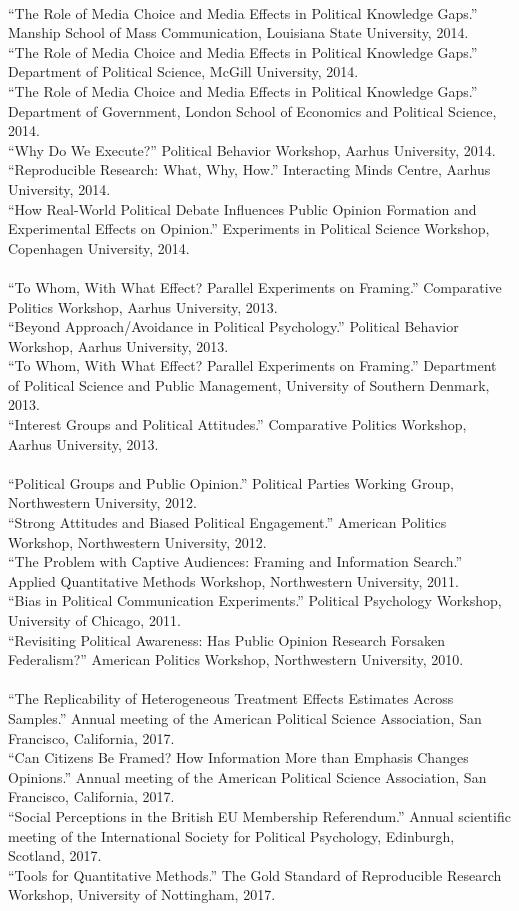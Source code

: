 \documentclass[12pt]{article}
\newcommand{\topic}[1]{\pagebreak[3]\indent {\color{lg}{\footnotesize #1 }}\\}
\newcommand{\entry}[1]{\indent {\color{lg}\guillemotright}\hspace{2pt}#1\vspace{.25em}\\}
\begin{document}
	\topic{Invited Presentations (2014)}
	\entry{``The Role of Media Choice and Media Effects in Political Knowledge Gaps.'' Manship School of Mass Communication, Louisiana State University, 2014.}
	\entry{``The Role of Media Choice and Media Effects in Political Knowledge Gaps.'' Department of Political Science, McGill University, 2014.}
	\entry{``The Role of Media Choice and Media Effects in Political Knowledge Gaps.'' Department of Government, London School of Economics and Political Science, 2014.}
	\entry{``Why Do We Execute?'' Political Behavior Workshop, Aarhus University, 2014.}
	\entry{``Reproducible Research: What, Why, How.'' Interacting Minds Centre, Aarhus University, 2014.}
	\entry{``How Real-World Political Debate Influences Public Opinion Formation and Experimental Effects on Opinion.'' Experiments in Political Science Workshop, Copenhagen University, 2014.}

	\topic{Invited Presentations (2013)}
	\entry{``To Whom, With What Effect? Parallel Experiments on Framing.'' Comparative Politics Workshop, Aarhus University, 2013.}
	\entry{``Beyond Approach/Avoidance in Political Psychology.'' Political Behavior Workshop, Aarhus University, 2013.}
	\entry{``To Whom, With What Effect? Parallel Experiments on Framing.'' Department of Political Science and Public Management, University of Southern Denmark, 2013.}
	\entry{``Interest Groups and Political Attitudes.'' Comparative Politics Workshop, Aarhus University, 2013.}
	
	\topic{Invited Presentations (2012 and earlier)}
	\entry{``Political Groups and Public Opinion.'' Political Parties Working Group, Northwestern University, 2012.}
	\entry{``Strong Attitudes and Biased Political Engagement.'' American Politics Workshop, Northwestern University, 2012.}
	\entry{``The Problem with Captive Audiences: Framing and Information Search.'' Applied Quantitative Methods Workshop, Northwestern University, 2011.}
	\entry{``Bias in Political Communication Experiments.'' Political Psychology Workshop, University of Chicago, 2011.}
	\entry{``Revisiting Political Awareness: Has Public Opinion Research Forsaken Federalism?'' American Politics Workshop, Northwestern University, 2010.}

	\topic{Conference Papers (2017)}
	\entry{``The Replicability of Heterogeneous Treatment Effects Estimates Across Samples.'' Annual meeting of the American Political Science Association, San Francisco, California, 2017.}
    \entry{``Can Citizens Be Framed? How Information More than Emphasis Changes Opinions.'' Annual meeting of the American Political Science Association, San Francisco, California, 2017.}
    \entry{``Social Perceptions in the British EU Membership Referendum.'' Annual scientific meeting of the International Society for Political Psychology, Edinburgh, Scotland, 2017.}
    \entry{``Tools for Quantitative Methods.'' The Gold Standard of Reproducible Research Workshop, University of Nottingham, 2017.}
	
\end{document}

